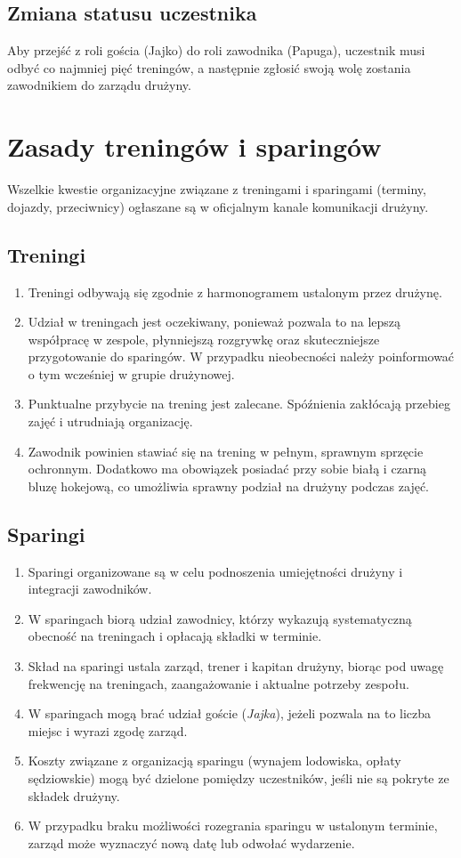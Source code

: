 \documentclass[12pt,a4paper]{article}
\let\stdsection\section
\renewcommand\section{\clearpage\stdsection}
\begin{document}
\subsection{Zmiana statusu uczestnika}
Aby przejść z roli gościa (Jajko) do roli zawodnika (Papuga), uczestnik musi odbyć co najmniej pięć treningów, a następnie zgłosić swoją wolę zostania zawodnikiem do zarządu drużyny.

\section{Zasady treningów i sparingów}
Wszelkie kwestie organizacyjne związane z treningami i sparingami (terminy, dojazdy, przeciwnicy) ogłaszane są w oficjalnym kanale komunikacji drużyny.

\subsection{Treningi}
\begin{enumerate}
  \item Treningi odbywają się zgodnie z harmonogramem ustalonym przez drużynę.
  \item Udział w treningach jest oczekiwany, ponieważ pozwala to na lepszą współpracę w zespole, płynniejszą rozgrywkę oraz skuteczniejsze przygotowanie do sparingów. W przypadku nieobecności należy poinformować o tym wcześniej w grupie drużynowej.
  \item Punktualne przybycie na trening jest zalecane. Spóźnienia zakłócają przebieg zajęć i utrudniają organizację.
  \item Zawodnik powinien stawiać się na trening w pełnym, sprawnym sprzęcie ochronnym. Dodatkowo ma obowiązek posiadać przy sobie białą i czarną bluzę hokejową, co umożliwia sprawny podział na drużyny podczas zajęć.

\end{enumerate}

\subsection{Sparingi}
\begin{enumerate}
  \item Sparingi organizowane są w celu podnoszenia umiejętności drużyny i integracji zawodników.
  \item W sparingach biorą udział zawodnicy, którzy wykazują systematyczną obecność na treningach i opłacają składki w terminie.
  \item Skład na sparingi ustala zarząd, trener i kapitan drużyny, biorąc pod uwagę frekwencję na treningach, zaangażowanie i aktualne potrzeby zespołu.
  \item W sparingach mogą brać udział goście (\textit{Jajka}), jeżeli pozwala na to liczba miejsc i wyrazi zgodę zarząd.
  \item Koszty związane z organizacją sparingu (wynajem lodowiska, opłaty sędziowskie) mogą być dzielone pomiędzy uczestników, jeśli nie są pokryte ze składek drużyny.
  \item W przypadku braku możliwości rozegrania sparingu w ustalonym terminie, zarząd może wyznaczyć nową datę lub odwołać wydarzenie.
\end{enumerate}
\end{document}
